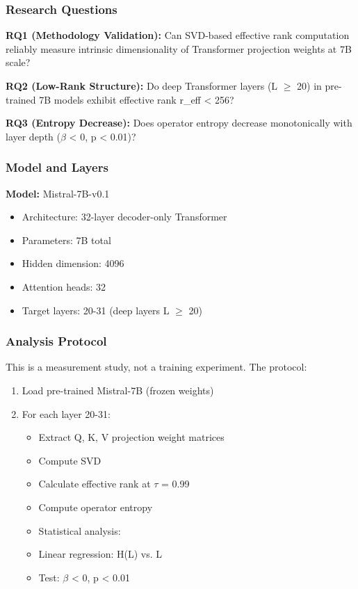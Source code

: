 
\subsubsection{Research Questions}

\textbf{RQ1 (Methodology Validation):} Can SVD-based effective rank computation reliably measure intrinsic dimensionality of Transformer projection weights at 7B scale?

\textbf{RQ2 (Low-Rank Structure):} Do deep Transformer layers (L $\geq$ 20) in pre-trained 7B models exhibit effective rank r\_eff < 256?

\textbf{RQ3 (Entropy Decrease):} Does operator entropy decrease monotonically with layer depth ($\beta$ < 0, p < 0.01)?

\subsubsection{Model and Layers}

\textbf{Model:} Mistral-7B-v0.1
\begin{itemize}
\item Architecture: 32-layer decoder-only Transformer
\item Parameters: 7B total
\item Hidden dimension: 4096
\item Attention heads: 32
\item Target layers: 20-31 (deep layers L $\geq$ 20)
\end{itemize}

\subsubsection{Analysis Protocol}

This is a measurement study, not a training experiment. The protocol:

\begin{enumerate}
\item Load pre-trained Mistral-7B (frozen weights)
\item For each layer 20-31:
\begin{itemize}
\item Extract Q, K, V projection weight matrices
\item Compute SVD
\item Calculate effective rank at $\tau$ = 0.99
\item Compute operator entropy
\item Statistical analysis:
\item Linear regression: H(L) vs. L
\item Test: $\beta$ < 0, p < 0.01
\end{itemize}
\end{enumerate}

